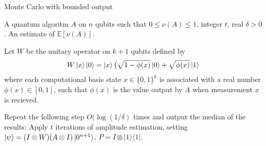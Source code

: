 \documentclass{article}
\begin{document}
\pagestyle{empty}

\begin{algorithm}[ht]
	\caption{Monte Carlo with bounded output}
	\begin{algorithmic}[1]

		\Require  A quantum algoritm $A$ on $n$ qubits such that $0\leq \nu(A) \leq 1$, integer $t$, real $\delta>0$.
		\Ensure An estimate of $\mathbb{E}[\nu(A)]$.
		\vspace{10pt}
		\Statex

		\State Let $W$ be the unitary operator on $k+1$ qubits defined by
		       \begin{equation}
		       W\ket{x}\ket{0} =\ket{x}\big(\sqrt{1-\phi(x)}\ket{0}+\sqrt{\phi(x)}\ket{1}
		       \end{equation}
		       where each computational basis state $x \in \{0,1\}^k$ is associated with a real number $\phi(x) \in [0,1]$, such that $\phi(x)$ is the value output by $A$ when measurement $x$ is recieved.

		 \State Repeat the following step $O(\log(1/\delta)$ times and output the median of the results:
		 Apply $t$ iterations of amplitude estimation, setting $\ket{\psi} = (I \otimes W)(A \otimes I)\ket{0^{n+1}}$, $P = I \otimes |1\rangle\langle 1|$.


	\end{algorithmic}
\end{algorithm}
\end{document}
